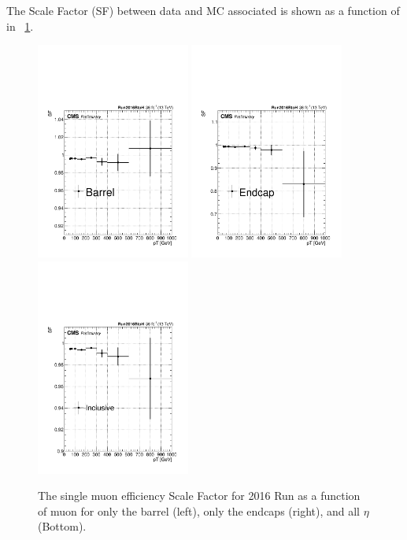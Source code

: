 The Scale Factor (SF) between data and MC associated is shown as a function of \pt in \figurename~\ref{fig:SFVsPt}.
\begin{figure}[htbp]
\centering
\includegraphics[width=0.45\textwidth]{Images/Cap5/FitSF_FinalSel_Iso0p1_B2H_Pt_B.pdf}
\includegraphics[width=0.45\textwidth]{Images/Cap5/FitSF_FinalSel_Iso0p1_B2H_Pt_E.pdf}
\includegraphics[width=0.45\textwidth]{Images/Cap5/FitSF_FinalSel_Iso0p1_B2H_Pt.pdf}
\caption{\label{fig:SFVsPt} The single muon efficiency Scale Factor for 2016 Run as a function of muon \pt for only the barrel (left), only the endcaps (right), and all $\eta$ (Bottom).}
\end{figure}

